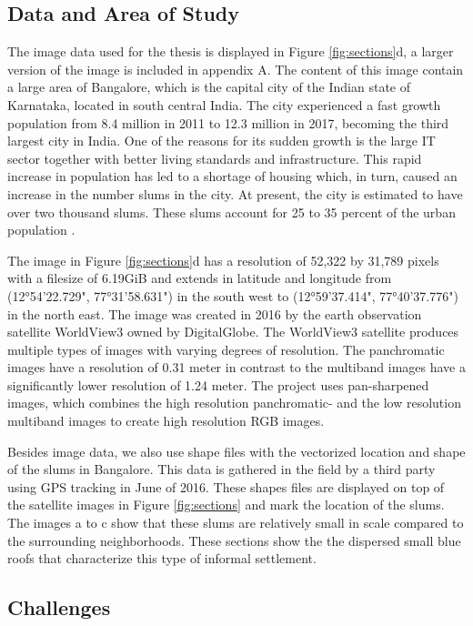 \subsection{Data and Area of Study}
The image data used for the thesis is displayed in Figure \ref{fig:sections}d, a larger version of the image is included in appendix A. The content of this image contain a large area of Bangalore, which is the capital city of the Indian state of Karnataka, located in south central India. The city experienced a fast growth population from 8.4 million in 2011 to 12.3 million in 2017, becoming the third largest city in India\cite{popcount2017}. One of the reasons for its sudden growth is the large IT sector together with better living standards and infrastructure. This rapid increase in population has led to a shortage of housing which, in turn, caused an increase in the number slums in the city. At present, the city is estimated to have over two thousand slums. These slums account for 25 to 35 percent of the urban population \cite{roy2018survey}.

The image in Figure \ref{fig:sections}d has a resolution of 52,322 by 31,789 pixels with a filesize of 6.19GiB and extends in latitude and longitude from  (12°54'22.729", 77°31'58.631") in the south west to (12°59'37.414", 77°40'37.776") in the north east. The image was created in 2016 by the earth observation satellite WorldView3 owned by DigitalGlobe. The WorldView3 satellite produces multiple types of images with varying degrees of resolution. The panchromatic images have a resolution of 0.31 meter in contrast to  the multiband images have a significantly lower resolution of 1.24 meter. The project uses pan-sharpened images, which combines the high resolution panchromatic- and the low resolution multiband images to create high resolution RGB images.

Besides image data, we also use shape files with the vectorized location and shape of the slums in Bangalore. This data is gathered in the field by a third party using GPS tracking in June of 2016. These shapes files are displayed on top of the satellite images in Figure \ref{fig:sections} and mark the location of the slums. The images a to c show that these slums are relatively small in scale compared to the surrounding neighborhoods. These sections show the the dispersed small blue roofs that characterize this type of informal settlement. 

\subsection{Challenges}

